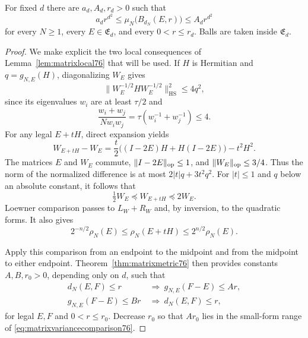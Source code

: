 \begin{lemma}\label{lem:matrixball76}
For fixed $d$ there are $a_d,A_d,r_d>0$ such that
\begin{equation}\label{eq:matrixball76}
 a_dr^{d^2}\le
 \mu_N\bigl(B_{d_N}(E,r)\bigr)
 \le A_dr^{d^2}
\end{equation}
for every $N\ge1$, every $E\in\mathfrak E_d$, and every
$0<r\le r_d$. Balls are taken inside $\mathfrak E_d$.
\end{lemma}
\begin{proof}
We make explicit the two local consequences of
Lemma~\ref{lem:matrixlocal76} that will be used. If $H$ is Hermitian and
$q=g_{N,E}(H)$, diagonalizing $W_E$ gives
\begin{equation}\label{eq:matrixnormalized76}
 \|W_E^{-1/2}HW_E^{-1/2}\|_{\mathrm{HS}}^2
 \le4q^2,
\end{equation}
since its eigenvalues $w_i$ are at least $\tau/2$ and
\[
 \frac{w_i+w_j}{Nw_iw_j}
                  =\tau(w_i^{-1}+w_j^{-1})\le4.
\]
For any legal $E+tH$, direct expansion yields
\[
 W_{E+tH}-W_E
 =\frac t2\bigl((I-2E)H+H(I-2E)\bigr)-t^2H^2.
\]
The matrices $E$ and $W_E$ commute, $\|I-2E\|_{\rm op}\le1$, and
$\|W_E\|_{\rm op}\le3/4$. Thus the norm of the normalized difference
is at most $2|t|q+3t^2q^2$. For $|t|\le1$ and $q$ below an absolute
constant, it follows that
\begin{equation}\label{eq:matrixvariancecomparison76}
 \tfrac12W_E\preceq W_{E+tH}\preceq2W_E.
\end{equation}
Loewner comparison passes to $L_W+R_W$ and, by inversion, to the
quadratic forms. It also gives
\begin{equation}\label{eq:matrixdensitycomparison76}
 2^{-n/2}\rho_N(E)\le\rho_N(E+tH)\le2^{n/2}\rho_N(E).
\end{equation}

Apply this comparison from an endpoint to the midpoint and from the
midpoint to either endpoint. Theorem~\ref{thm:matrixmetric76} then
provides constants $A,B,r_0>0$, depending only on $d$, such that
\begin{align}
 d_N(E,F)\le r&\ \Longrightarrow\
       g_{N,E}(F-E)\le Ar,\label{eq:matrixballupperellipse76}\\
 g_{N,E}(F-E)\le Br&\ \Longrightarrow\
       d_N(E,F)\le r,\label{eq:matrixballlowerellipse76}
\end{align}
for legal $E,F$ and $0<r\le r_0$. Decrease $r_0$ so that $Ar_0$
lies in the small-form range of \eqref{eq:matrixvariancecomparison76}.


\end{proof}
